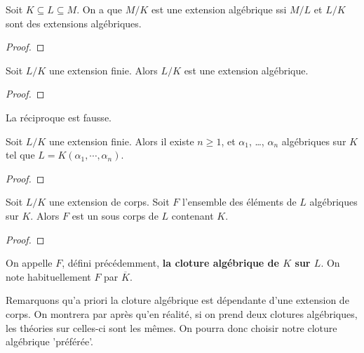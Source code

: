 \begin{proposition}
	Soit $K \subseteq L \subseteq M$. On a que $M/K$ est une extension
	algébrique ssi $M/L$ et $L/K$ sont des extensions algébriques.
\end{proposition}

\ifdefined\outputproof
\begin{proof}

\end{proof}
\fi

\begin{proposition}
	Soit $L/K$ une extension finie. Alors $L/K$ est une extension algébrique.
\end{proposition}

\ifdefined\outputproof
\begin{proof}

\end{proof}
\fi

\begin{remarque}
	La réciproque est fausse.
\end{remarque}

\begin{proposition}
	Soit $L/K$ une extension finie. Alors il existe $n \geq 1$, et $\alpha_{1}$,
	\ldots, $\alpha_{n}$ algébriques sur $K$ tel que $L = K(\alpha_{1}, \cdots,
	\alpha_{n})$.
\end{proposition}

\ifdefined\outputproof
\begin{proof}

\end{proof}
\fi

\begin{proposition}
	Soit $L/K$ une extension de corps.
	Soit $F$ l'ensemble des éléments de $L$ algébriques sur $K$.
	Alors $F$ est un sous corps de $L$ contenant $K$.
\end{proposition}

\ifdefined\outputproof
\begin{proof}

\end{proof}
\fi

\begin{definition}
	On appelle $F$, défini précédemment, \textbf{la cloture algébrique de $K$
	sur $L$}.
	On note habituellement $F$ par $\overline{K}$.
\end{definition}

Remarquons qu'a priori la cloture algébrique est dépendante d'une extension de
corps. On montrera par après qu'en réalité, si on prend deux clotures
algébriques, les théories sur celles-ci sont les mêmes. On pourra donc choisir
notre cloture algébrique 'préférée'.


